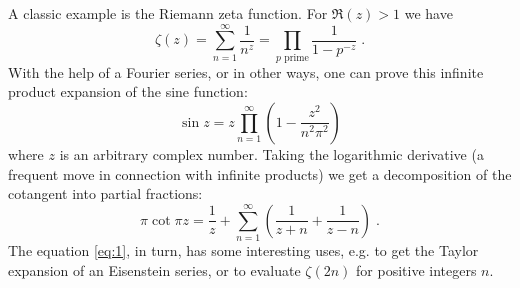 \documentclass[12pt]{article}
\begin{document}
A classic example is the Riemann zeta function.
For $\Re(z)>1$ we have
$$\zeta(z)=\sum_{n=1}^\infty\frac{1}{n^z}=
\prod_{p\text{ prime}}\frac{1}{1-p^{-z}}\;.$$
With the help of a Fourier series, or in other ways, one can prove
this infinite product expansion of the sine function:
\begin{equation} \label{eq:sin}
\sin z=z\prod_{n=1}^\infty\left(1-\frac{z^2}{n^2\pi^2}\right)
\end{equation}
where $z$ is an arbitrary complex number.
Taking the logarithmic derivative (a frequent move in connection with
infinite products) we get a decomposition
of the cotangent into partial fractions:
\begin{equation} \label{eq:1}
\pi\cot\pi z=\frac{1}{z}+\sum_{n=1}^\infty
\left(\frac{1}{z+n}+\frac{1}{z-n}\right)\;.
\end{equation}
The equation \eqref{eq:1}, in turn, has some interesting uses, e.g. to get
the Taylor expansion of an Eisenstein series, or to evaluate
$\zeta(2n)$ for positive integers $n$.
\end{document}
